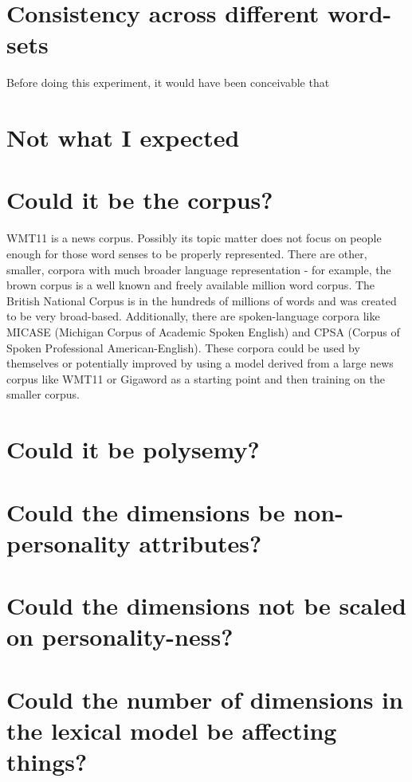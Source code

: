 \documentclass[eric_thesis.tex]{subfiles}
\begin{document}
\section{Consistency across different word-sets}

Before doing this experiment, it would have been conceivable that

\section{Not what I expected}

\section{Could it be the corpus?}

WMT11 is a news corpus. Possibly its topic matter does not focus on people enough for those word senses to be properly represented. There are other, smaller, corpora with much broader language representation - for example, the brown corpus is a well known and freely available million word corpus. The British National Corpus is in the hundreds of millions of words and was created to be very broad-based. Additionally, there are spoken-language corpora like MICASE (Michigan Corpus of Academic Spoken English) and CPSA (Corpus of Spoken Professional American-English). These corpora could be used by themselves or potentially improved by using a model derived from a large news corpus like WMT11 or Gigaword as a starting point and then training on the smaller corpus.

\section{Could it be polysemy?}

\section{Could the dimensions be non-personality attributes?}
\section{Could the dimensions not be scaled on personality-ness?}


\section{Could the number of dimensions in the lexical model be affecting things?}
\end{document}

